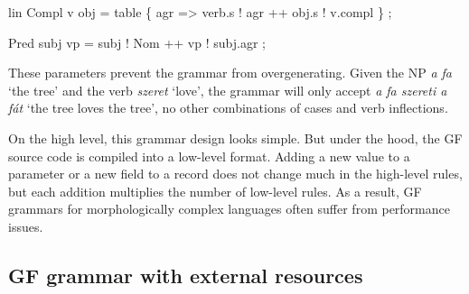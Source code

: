 \documentclass[10pt,a4paper]{article}
\newenvironment{Shaded}{\begin{snugshade}}{\end{snugshade}}
\newcommand{\DataTypeTok}[1]{\textcolor[rgb]{0.13,0.29,0.53}{{#1}}}
\newcommand{\OtherTok}[1]{\textcolor[rgb]{0.56,0.35,0.01}{{#1}}}
\newcommand{\FunctionTok}[1]{\textcolor[rgb]{0.00,0.00,0.00}{{#1}}}
\newcommand{\NormalTok}[1]{{#1}}
\begin{document}
\begin{Shaded}
\begin{Highlighting}[]
  \NormalTok{lin }
    \DataTypeTok{Compl} \NormalTok{v obj }\FunctionTok{=}
     \NormalTok{table \{ agr }\OtherTok{=>} \NormalTok{verb}\FunctionTok{.}\NormalTok{s }\FunctionTok{!} \NormalTok{agr}
                 \FunctionTok{++} \NormalTok{obj}\FunctionTok{.}\NormalTok{s }\FunctionTok{!} \NormalTok{v}\FunctionTok{.}\NormalTok{compl \} ;}

    \DataTypeTok{Pred} \NormalTok{subj vp }\FunctionTok{=} \NormalTok{subj }\FunctionTok{!} \DataTypeTok{Nom} 
                \FunctionTok{++} \NormalTok{vp }\FunctionTok{!} \NormalTok{subj}\FunctionTok{.}\NormalTok{agr ;}
\end{Highlighting}
\end{Shaded}




\noindent These parameters prevent the grammar from overgenerating.
Given the NP \emph{a fa} `the tree' and the verb
\emph{szeret} `love', the grammar will only accept \emph{a fa szereti a
  f\'{a}t} `the tree loves the tree', no other combinations of cases and verb inflections.

On the high level, this grammar design looks simple. 
But under the hood, the GF source code is compiled into a low-level
format. Adding a new value to a parameter or a new field to a record 
does not change much in the high-level rules, but each addition
multiplies the number of low-level rules. As a result, GF grammars for
morphologically complex languages often suffer from performance issues.


\subsection{GF grammar with external resources}
\label{sec:GFext}
\end{document}
